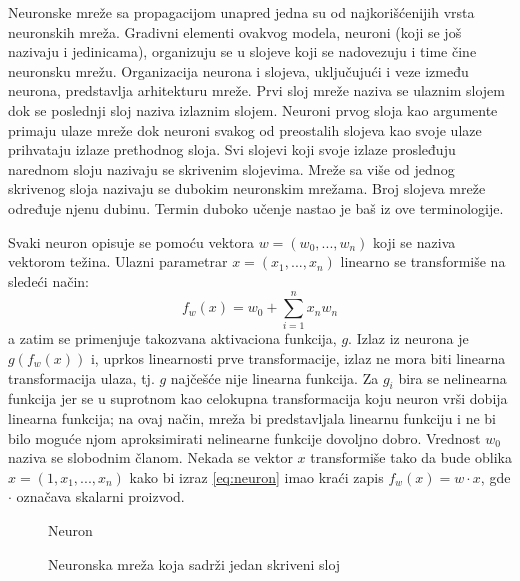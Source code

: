 Neuronske mreže sa propagacijom unapred jedna su od najkorišćenijih vrsta neuronskih mreža. Gradivni elementi ovakvog modela, neuroni (koji se još nazivaju i jedinicama), organizuju se u slojeve koji se nadovezuju i time čine neuronsku mrežu. Organizacija neurona i slojeva, uključujući i veze između neurona, predstavlja arhitekturu mreže. Prvi sloj mreže naziva se ulaznim slojem dok se poslednji sloj naziva izlaznim slojem. Neuroni prvog sloja kao argumente primaju ulaze mreže dok neuroni svakog od preostalih slojeva kao svoje ulaze prihvataju izlaze prethodnog sloja. Svi slojevi koji svoje izlaze prosleđuju narednom sloju nazivaju se skrivenim slojevima. Mreže sa više od jednog skrivenog sloja nazivaju se dubokim neuronskim mrežama.  Broj slojeva mreže određuje njenu dubinu. Termin duboko učenje nastao je baš iz ove terminologije.


\par
Svaki neuron opisuje se pomoću vektora $w = (w_0, ..., w_n)$ koji se naziva vektorom težina. Ulazni parametrar $x = (x_1, ..., x_n)$ linearno se transformiše na sledeći način:
\begin{equation}
\label{eq:neuron}
		f_w(x) = w_0 + \sum_{i=1}^{n} x_nw_n 
\end{equation}
a zatim se primenjuje takozvana aktivaciona funkcija, $g$. Izlaz iz neurona je $g(f_w(x))$ i, uprkos linearnosti prve transformacije, izlaz ne mora biti linearna transformacija ulaza, tj. $g$ najčešće nije linearna funkcija. Za $g_i$ bira se nelinearna funkcija jer se u suprotnom kao celokupna transformacija koju neuron vrši dobija linearna funkcija; na ovaj način, mreža bi predstavljala linearnu funkciju i ne bi bilo moguće njom aproksimirati nelinearne funkcije dovoljno dobro. Vrednost $w_0$ naziva se slobodnim članom. Nekada se vektor $x$ transformiše tako da bude oblika $x = (1, x_1, ..., x_n)$ kako bi izraz \eqref{eq:neuron} imao kraći zapis $f_w(x) = w \cdot x$, gde $\cdot$ označava skalarni proizvod.\\

\begin{figure}
	\centering
	\resizebox{.5\linewidth}{!}{}
	\caption{Neuron}
	\label{fig:neuron}
\end{figure}

\begin{figure}
	\centering
	\resizebox{.5\linewidth}{!}{}
	\caption{Neuronska mreža koja sadrži jedan skriveni sloj}
	\label{fig:mreza}
\end{figure}


